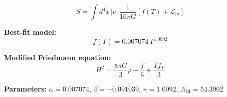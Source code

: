 
\begin{equation}
  S = \int d^4x \, |e| \, \frac{1}{16\pi G} \left[ f(T) + \mathcal{L}_m \right]
\end{equation}

\textbf{Best-fit model:}
\begin{equation}
  f(T) = 0.007074 \, T^{1.0092}
\end{equation}

\textbf{Modified Friedmann equation:}
\begin{equation}
  H^2 = \frac{8\pi G}{3} \rho - \frac{f}{6} + \frac{T f_T}{3}
\end{equation}

\textbf{Parameters:}
$\alpha = 0.007074$, \quad
$\beta = -0.091039$, \quad
$n = 1.0092$, \quad
$\Lambda_{\text{BI}} = 54.3902$